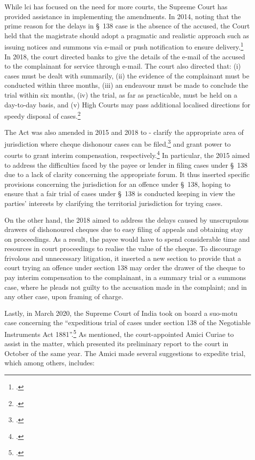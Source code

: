 While \gls{lci} has focused on the need for more courts, the Supreme Court has provided assistance in implementing the amendments. In 2014, noting that the prime reason for the delays in \S~138 case is the absence of the accused, the Court held that the magistrate should adopt a pragmatic and realistic approach such as issuing notices and summons via e-mail or push notification to ensure delivery.\footcite{sc2014_iba} In 2018, the court directed banks to give the details of the e-mail of the accused to the complainant for service through e-mail. The court also directed that: (i) cases must be dealt with summarily, (ii) the evidence of the complainant must be conducted within three months, (iii) an endeavour must be made to conclude the trial within six months, (iv) the trial, as far as practicable, must be held on a day-to-day basis, and (v) High Courts may pass additional localised directions for speedy disposal of cases.\footcite{sc2018_meters}

The Act was also amended in 2015 and 2018 to - clarify the appropriate area of jurisdiction where cheque dishonour cases can be filed,\footcite{niAmend2015} and grant power to courts to grant interim compensation, respectively.\footcite{niAmend2018} In particular, the  2015 aimed to address the difficulties faced by the payee or lender in filing cases under \S~138 due to a lack of clarity concerning the appropriate forum. It thus inserted specific provisions concerning the jurisdiction for an offence under \S~138, hoping to ensure that a fair trial of cases under \S~138 is conducted keeping in view the parties' interests by clarifying the territorial jurisdiction for trying cases.

On the other hand, the  2018 aimed to address the delays caused by unscrupulous drawers of dishonoured cheques due to easy filing of appeals and obtaining stay on proceedings. As a result, the payee would have to spend considerable time and resources in court proceedings to realise the value of the cheque. To discourage frivolous and unnecessary litigation, it inserted a new section to provide that a court trying an offence under section 138 may order the drawer of the cheque to pay interim compensation to the complainant, in a summary trial or a summons case, where he pleads not guilty to the accusation made in the complaint; and in any other case, upon framing of charge.

Lastly, in March 2020, the Supreme Court of India took on board a suo-motu case concerning the “expeditious trial of cases under section 138 of the Negotiable Instruments Act 1881”.\footcite{sc2020_138} As mentioned, the court-appointed Amici Curiae to assist in the matter, which presented its preliminary report to the court in October of the same year. The Amici made several suggestions to expedite trial, which among others, includes:

